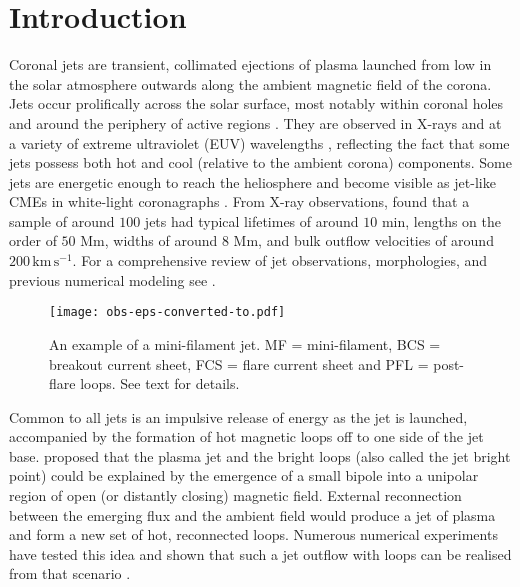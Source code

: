 \documentclass[twocolumn]{aastex6}
\begin{document}
\section{Introduction}
Coronal jets are transient, collimated ejections of plasma launched from low in the solar atmosphere outwards along the ambient magnetic field of the corona. Jets occur prolifically across the solar surface, most notably within coronal holes and around the periphery of active regions \citep{Shimojo1996,Savcheva2007}. They are observed in X-rays \citep[e.g.][]{Shimojo1996,Cirtain2007} and at a variety of extreme ultraviolet (EUV) wavelengths \citep[e.g.][]{Nistico2009,Zhang2016b}, reflecting the fact that some jets possess both hot and cool (relative to the ambient corona) components. Some jets are energetic enough to reach the heliosphere and become visible as jet-like CMEs in white-light coronagraphs \citep[e.g.][]{Wang1998,Patsourakos2008,Hong2011,Moore2015}. From X-ray observations, \citet{Savcheva2007} found that a sample of around $100$ jets had typical lifetimes of around $10$ min, lengths on the order of $50$ Mm, widths of around $8$ Mm, and bulk outflow velocities of around $200 \,\text{km}\,\text{s}^{-1}$. {For a comprehensive review of jet observations, morphologies, and previous numerical modeling see \citet{Raouafi2016}.}

\begin{figure}
\centering
\texttt{[image: obs-eps-converted-to.pdf]}
\caption{An example of a mini-filament jet. MF = mini-filament, BCS = breakout current sheet, FCS = flare current sheet and PFL = post-flare loops. See text for details.}
\label{fig:obs}
\end{figure}

Common to all jets is an impulsive release of energy as the jet is launched, accompanied by the formation of hot magnetic loops off to one side of the jet base. \citet{Shibata1992} proposed that the plasma jet and the bright loops (also called the jet bright point) could be explained by the emergence of a small bipole into a unipolar region of open (or distantly closing) magnetic field. External reconnection between the emerging flux and the ambient field would produce a jet of plasma and form a new set of hot, reconnected loops. Numerous numerical experiments have tested this idea and shown that such a jet outflow with loops can be realised from that scenario \citep[e.g.][]{Yokoyama1995,Yokoyama1996,Miyagoshi2003,Miyagoshi2004,Archontis2005,Galsgaard2005,Moreno-Insertis2008,Gontikakis2009,Archontis2010}.
\end{document}
